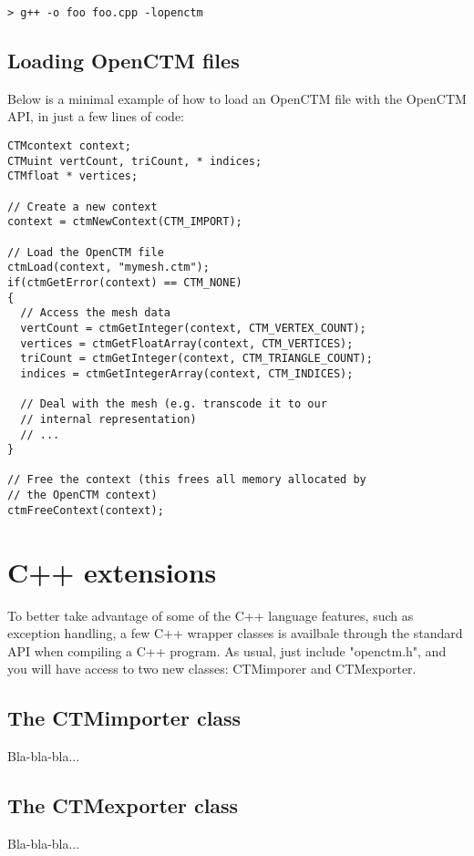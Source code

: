 \begin{lstlisting}
> g++ -o foo foo.cpp -lopenctm
\end{lstlisting}


\section{Loading OpenCTM files}
Below is a minimal example of how to load an OpenCTM file with the OpenCTM API,
in just a few lines of code:

\begin{lstlisting}
CTMcontext context;
CTMuint vertCount, triCount, * indices;
CTMfloat * vertices;

// Create a new context
context = ctmNewContext(CTM_IMPORT);

// Load the OpenCTM file
ctmLoad(context, "mymesh.ctm");
if(ctmGetError(context) == CTM_NONE)
{
  // Access the mesh data
  vertCount = ctmGetInteger(context, CTM_VERTEX_COUNT);
  vertices = ctmGetFloatArray(context, CTM_VERTICES);
  triCount = ctmGetInteger(context, CTM_TRIANGLE_COUNT);
  indices = ctmGetIntegerArray(context, CTM_INDICES);

  // Deal with the mesh (e.g. transcode it to our
  // internal representation)
  // ...
}

// Free the context (this frees all memory allocated by
// the OpenCTM context)
ctmFreeContext(context);
\end{lstlisting}




\chapter{C++ extensions}
To better take advantage of some of the C++ language features, such as
exception handling, a few C++ wrapper classes is availbale through the standard
API when compiling a C++ program. As usual, just include "openctm.h", and you
will have access to two new classes: CTMimporer and CTMexporter.


\section{The CTMimporter class}
Bla-bla-bla...


\section{The CTMexporter class}
Bla-bla-bla...



